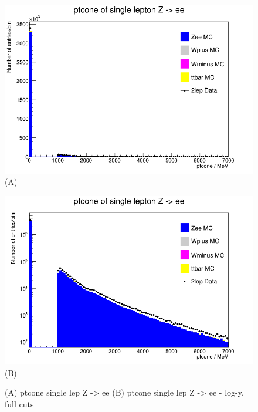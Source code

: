 \begin{figure}[h!]
    \centering
    \begin{minipage}{0.5\textwidth}
        \centering
        \includegraphics[width=\linewidth]{plots/05-03-2021/17-31_05-03-21.png}
        (A)
    \end{minipage}\hfill
    \begin{minipage}{0.5\textwidth}
        \centering
        \includegraphics[width=\linewidth]{plots/05-03-2021/17-30_05-03-21.png}
        (B)
    \end{minipage}
    \caption{(A) ptcone single lep Z -> ee (B) ptcone single lep Z -> ee - log-y. full cuts }
    \label{}
\end{figure}

